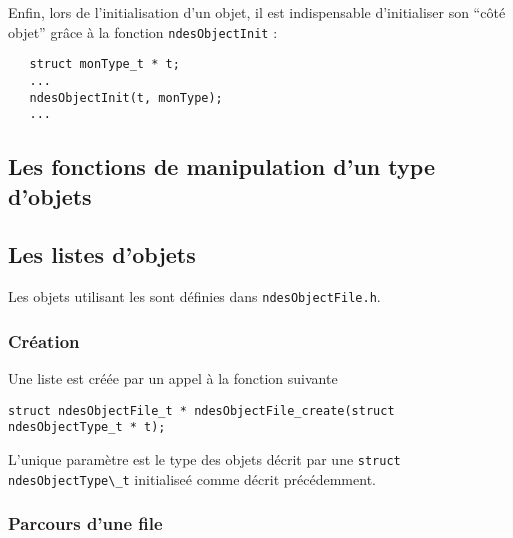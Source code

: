    Enfin, lors de l'initialisation d'un objet, il est indispensable
d'initialiser son ``côté objet'' grâce à la fonction
\lstinline!ndesObjectInit! :

\begin{verbatim}
   struct monType_t * t;
   ...
   ndesObjectInit(t, monType);
   ...
\end{verbatim}

%
\subsection{Les fonctions de manipulation d'un type d'objets}

%
\subsection{Les listes d'objets}

   Les objets utilisant  les sont définies dans {\tt ndesObjectFile.h}.

%
\subsubsection{Création}

   Une liste est créée par un appel à la fonction suivante

\begin{verbatim}
struct ndesObjectFile_t * ndesObjectFile_create(struct ndesObjectType_t * t);
\end{verbatim}

   L'unique paramètre est le type des objets décrit par une
\lstinline{struct ndesObjectType\_t} initialiseé comme décrit
précédemment.

%
\subsubsection{Parcours d'une file}

